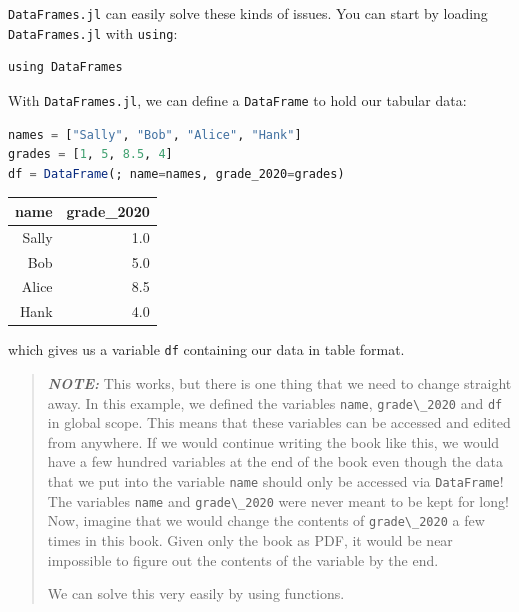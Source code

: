 \documentclass[
  notoc %
]{tufte-book}
\newcommand{\passthrough}[1]{#1}
\begin{document}
\passthrough{\lstinline!DataFrames.jl!} can easily solve these kinds of
issues. You can start by loading \passthrough{\lstinline!DataFrames.jl!}
with \passthrough{\lstinline!using!}:

\begin{lstlisting}
using DataFrames
\end{lstlisting}

With \passthrough{\lstinline!DataFrames.jl!}, we can define a
\passthrough{\lstinline!DataFrame!} to hold our tabular data:

\begin{lstlisting}[language=Julia]
names = ["Sally", "Bob", "Alice", "Hank"]
grades = [1, 5, 8.5, 4]
df = DataFrame(; name=names, grade_2020=grades)
\end{lstlisting}

\begin{longtable}[]{@{}rr@{}}
\toprule
name & grade\_2020 \\
\midrule
\endhead
Sally & 1.0 \\
Bob & 5.0 \\
Alice & 8.5 \\
Hank & 4.0 \\
\bottomrule
\end{longtable}

which gives us a variable \passthrough{\lstinline!df!} containing our
data in table format.

\begin{quote}
\textbf{\emph{NOTE:}} This works, but there is one thing that we need to
change straight away. In this example, we defined the variables
\passthrough{\lstinline!name!}, \passthrough{\lstinline!grade\_2020!}
and \passthrough{\lstinline!df!} in global scope. This means that these
variables can be accessed and edited from anywhere. If we would continue
writing the book like this, we would have a few hundred variables at the
end of the book even though the data that we put into the variable
\passthrough{\lstinline!name!} should only be accessed via
\passthrough{\lstinline!DataFrame!}! The variables
\passthrough{\lstinline!name!} and \passthrough{\lstinline!grade\_2020!}
were never meant to be kept for long! Now, imagine that we would change
the contents of \passthrough{\lstinline!grade\_2020!} a few times in
this book. Given only the book as PDF, it would be near impossible to
figure out the contents of the variable by the end.

We can solve this very easily by using functions.
\end{quote}
\end{document}
